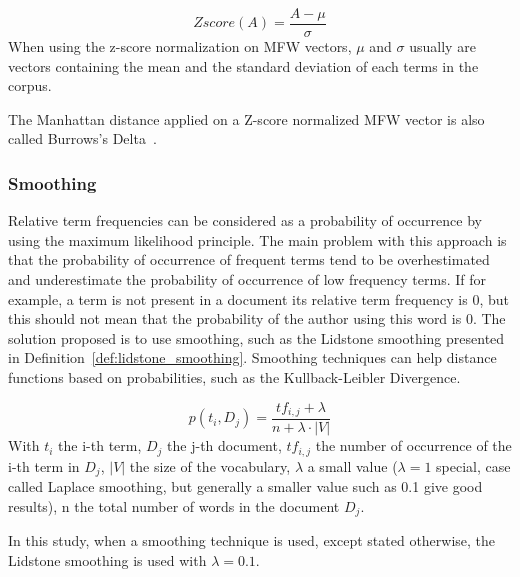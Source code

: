 \begin{definition}
  \label{def:z_score}
  \begin{equation}
    Zscore(A) = \frac{A - \mu}{\sigma}
  \end{equation}
  When using the z-score normalization on MFW vectors, $\mu$ and $\sigma$ usually are vectors containing the mean and the standard deviation of each terms in the corpus.
\end{definition}

The Manhattan distance applied on a Z-score normalized MFW vector is also called Burrows's Delta~\cite{savoy_stylo}.

\subsubsection{Smoothing}

Relative term frequencies can be considered as a probability of occurrence by using the maximum likelihood principle.
The main problem with this approach is that the probability of occurrence of frequent terms tend to be overhestimated and underestimate the probability of occurrence of low frequency terms.
If for example, a term is not present in a document its relative term frequency is 0, but this should not mean that the probability of the author using this word is 0.
The solution proposed is to use smoothing, such as the Lidstone smoothing presented in Definition~\ref{def:lidstone_smoothing}.
Smoothing techniques can help distance functions based on probabilities, such as the Kullback-Leibler Divergence.~\cite{savoy_stylo}

\begin{definition}
  \label{def:lidstone_smoothing}
  \begin{equation}
    p(t_i, D_j) = \frac{tf_{i,j} + \lambda}{n + \lambda \cdot |V|}
  \end{equation}
  With $t_i$ the i-th term, $D_j$ the j-th document, $tf_{i,j}$ the number of occurrence of the i-th term in $D_j$, $|V|$ the size of the vocabulary, $\lambda$ a small value ($\lambda = 1$ special, case called Laplace smoothing, but generally a smaller value such as 0.1 give good results), n the total number of words in the document $D_j$.
\end{definition}

In this study, when a smoothing technique is used, except stated otherwise, the Lidstone smoothing is used with $\lambda = 0.1$.

